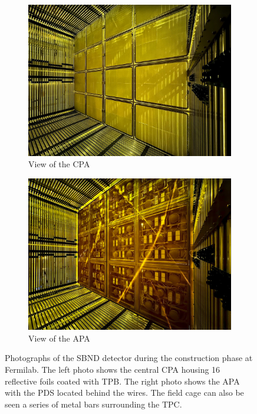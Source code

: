 \begin{figure}[htbp!]
\begin{subfigure}[h]{0.5\linewidth}
\centering    
\includegraphics[width=\linewidth]{SBND_CPA}
\caption{View of the CPA}
\end{subfigure}
\hfill
\begin{subfigure}[h]{0.5\linewidth}
\centering    
\includegraphics[width=\linewidth]{SBND_APA_PDS}
\caption{View of the APA}
\end{subfigure}%
\caption[SBND_CPA_APA]{
Photographs of the SBND detector during the construction phase at Fermilab. 
The left photo shows the central CPA housing 16 reflective foils coated with TPB.
The right photo shows the APA with the PDS located behind the wires.
The field cage can also be seen a series of metal bars surrounding the TPC.
}\label{fig:SBND_CPA_APA}
\end{figure}

